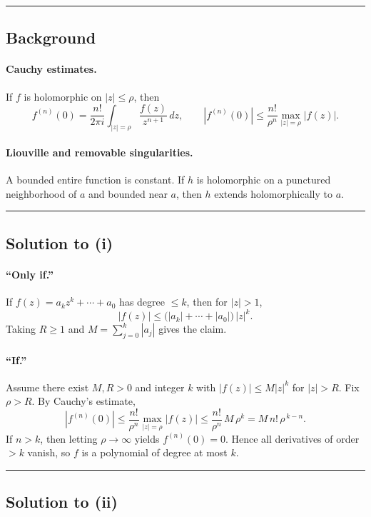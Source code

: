 \documentclass[11pt]{article}
\begin{document}
\bigskip\hrule\bigskip

\subsection*{Background}
\paragraph{Cauchy estimates.}
If $f$ is holomorphic on $|z|\le \rho$, then
\[
f^{(n)}(0)=\frac{n!}{2\pi i}\int_{|z|=\rho}\frac{f(z)}{z^{n+1}}\,dz,
\qquad
|f^{(n)}(0)|\le \frac{n!}{\rho^{n}}\max_{|z|=\rho}|f(z)|.
\]

\paragraph{Liouville and removable singularities.}
A bounded entire function is constant. If $h$ is holomorphic on a punctured neighborhood of $a$ and bounded near $a$, then $h$ extends holomorphically to $a$.

\bigskip\hrule\bigskip

\subsection*{Solution to (i)}

\paragraph{``Only if.''}
If $f(z)=a_k z^k+\cdots +a_0$ has degree $\le k$, then for $|z|>1$,
\[
|f(z)|\le \big(|a_k|+\cdots+|a_0|\big)\,|z|^{k}.
\]
Taking $R\ge 1$ and $M=\sum_{j=0}^{k}|a_j|$ gives the claim.

\medskip

\paragraph{``If.''}
Assume there exist $M,R>0$ and integer $k$ with $|f(z)|\le M|z|^{k}$ for $|z|>R$.
Fix $\rho>R$. By Cauchy’s estimate,
\[
|f^{(n)}(0)|\le \frac{n!}{\rho^{n}}\max_{|z|=\rho}|f(z)|
\le \frac{n!}{\rho^{n}}\,M\,\rho^{k}
= M\,n!\,\rho^{\,k-n}.
\]
If $n>k$, then letting $\rho\to\infty$ yields $f^{(n)}(0)=0$. Hence all derivatives of order $>k$ vanish, so $f$ is a polynomial of degree at most $k$.

\bigskip\hrule\bigskip

\subsection*{Solution to (ii)}
\end{document}
